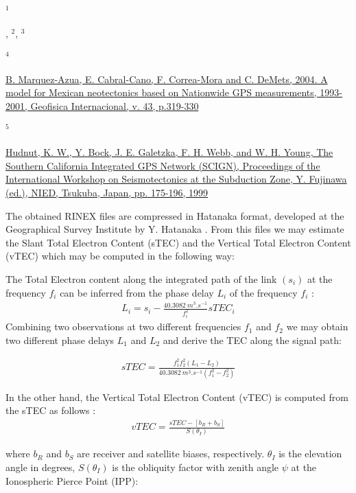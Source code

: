 \begin{landscape}
\begin{minipage}{0.9\linewidth}
      \hypertarget{Hudnut}{${}^1$}\citet{Hudnut:2002},
      \hypertarget{Garnier}{${}^2$}\citet{Garnier:2021}, 
      \hypertarget{Graham}{${}^3$}\citet{Graham:2016}
      
      \hypertarget{Marquez}{${}^4$}\href{https://doi.org/10.7283/T58S4N9N}{B. Marquez-Azua, E. Cabral-Cano, F. Correa-Mora and C. DeMets, 2004. A model for Mexican neotectonics based on Nationwide GPS measurements, 1993-2001, Geofisica Internacional, v. 43, p.319-330}
      
      \hypertarget{Hudnut2}{${}^5$}\href{https://doi.org/10.7283/T5668BHN}{Hudnut, K. W., Y. Bock, J. E. Galetzka, F. H. Webb, and W. H. Young, The Southern California Integrated GPS Network (SCIGN), Proceedings of the International Workshop on Seismotectonics at the Subduction Zone, Y. Fujinawa (ed.), NIED, Tsukuba, Japan, pp. 175-196, 1999}    
    \end{minipage}
  \end{landscape}
  \clearpage
  \twocolumn

  The obtained RINEX files are compressed in Hatanaka format, developed at the Geographical Survey Institute by Y. Hatanaka \citep{Kumar:2012}. From this files we may estimate the Slant Total Electron Content (sTEC) and the Vertical Total Electron Content (vTEC) which may be computed in the following way:

  The Total Electron content along the integrated path of the link $(s_i)$ at the frequency $f_i$ can be inferred from the phase delay $L_i$ of the frequency $f_i$ \citep{Emery:2017}:
  \begin{align}
    L_i = s_i - \frac{\SI{40.3082}{m^3.s^{-1}}}{f_i^2}sTEC_i
  \end{align}
  Combining two observations at two different frequencies $f_1$ and $f_2$ we may obtain two different phase delays $L_1$ and $L_2$ and derive the TEC along the signal path:

  \begin{align}
    sTEC = \frac{f_1^2f_2^2\left(L_1-L_2\right)}{\SI{40.3082}{m^3.s^{-1}}\left(f_1^2-f_2^2\right)}
  \end{align}

  In the other hand, the Vertical Total Electron Content (vTEC) is computed from the sTEC as follows \citep{Kumar:2012}:
  \begin{align}
    vTEC = \frac{sTEC-\left[b_R+b_S\right]}{S(\theta_I)}
  \end{align}

  where $b_R$ and $b_S$ are receiver and satellite biases, respectively. $\theta_I$ is the elevation angle in degrees, $S(\theta_I)$ is the obliquity factor with zenith angle $\psi$ at the Ionospheric Pierce Point (IPP):

